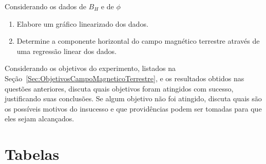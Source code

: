 \begin{question}[type={exam}]
Considerando os dados de $B_H$ e de $\phi$
\begin{enumerate}[label=\roman*.]
    \item Elabore um gráfico linearizado dos dados.
    \item Determine a componente horizontal do campo magnético terrestre através de uma regressão linear dos dados. 
\end{enumerate}
\end{question}

\begin{question}[type={exam}]
Considerando os objetivos do experimento, listados na Seção~\ref{Sec:ObjetivosCampoMagneticoTerrestre}, e os resultados obtidos nas questões anteriores, discuta quais objetivos foram atingidos com sucesso, justificando suas conclusões. Se algum objetivo não foi atingido, discuta quais são os possíveis motivos do insucesso e que providências podem ser tomadas para que eles sejam alcançados.
\end{question}

\vfill
\pagebreak
\section{Tabelas}

